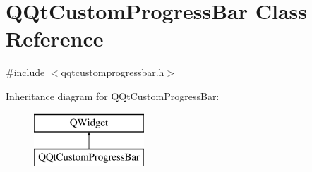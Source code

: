 \hypertarget{class_q_qt_custom_progress_bar}{}\section{Q\+Qt\+Custom\+Progress\+Bar Class Reference}
\label{class_q_qt_custom_progress_bar}


{\ttfamily \#include $<$qqtcustomprogressbar.\+h$>$}

Inheritance diagram for Q\+Qt\+Custom\+Progress\+Bar\+:\begin{figure}[H]
\begin{center}
\leavevmode
\includegraphics[height=2.000000cm]{class_q_qt_custom_progress_bar}
\end{center}
\end{figure}

